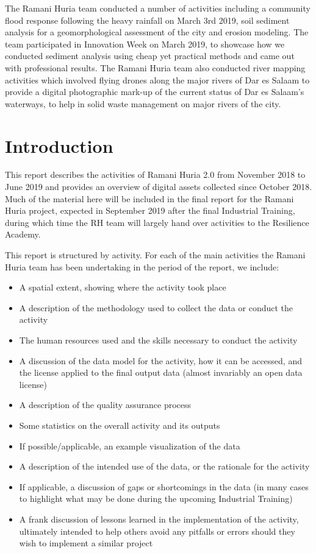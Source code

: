\documentclass[a4paper,12pt,twoside]{article}
\begin{document}
\begin{multicols}{2}
The Ramani Huria team conducted a number of activities including a community flood response following the heavy rainfall on March 3rd 2019, soil sediment analysis for a geomorphological assessment of the city and erosion modeling. The team participated in Innovation Week on March 2019, to showcase how we conducted sediment analysis using cheap yet practical methods and came out with professional results. The Ramani Huria team also conducted river mapping activities which involved flying drones along the major rivers of Dar es Salaam to  provide a digital photographic mark-up of the current status of Dar es Salaam’s waterways, to help in solid waste management on major rivers of the city.

\end{multicols}

\newpage
\section{Introduction}
\label{Introduction}

This report describes the activities of Ramani Huria 2.0 from November 2018 to June 2019 and provides an overview of digital assets collected since October 2018. Much of the material here will be included in the final report for the Ramani Huria project, expected in September 2019 after the final Industrial Training, during which time the RH team will largely hand over activities to the Resilience Academy.

This report is structured by activity. For each of the main activities the Ramani Huria team has been undertaking in the period of the report, we include:

\begin{itemize}
  \item A spatial extent, showing where the activity took place
  \item A description of the methodology used to collect the data or conduct the activity
  \item The human resources used and the skills necessary to conduct the activity
  \item A discussion of the data model for the activity, how it can be accessed, and the license applied to the final output data (almost invariably an open data license)
  \item A description of the quality assurance process
  \item Some statistics on the overall activity and its outputs
  \item If possible/applicable, an example visualization of the data
  \item A description of the intended use of the data, or the rationale for the activity
  \item If applicable, a discussion of gaps or shortcomings in the data (in many cases to highlight what may be done during the upcoming Industrial Training)
  \item A frank discussion of lessons learned in the implementation of the activity, ultimately intended to help others avoid any pitfalls or errors should they wish to implement a similar project
\end{itemize}
\end{document}
